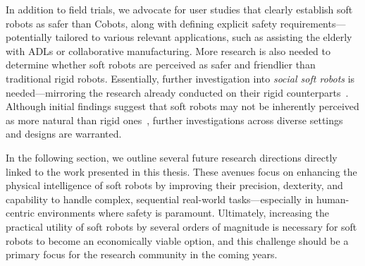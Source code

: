 In addition to field trials, we advocate for user studies that clearly establish soft robots as safer than \glspl{Cobot}, along with defining explicit safety requirements—potentially tailored to various relevant applications, such as assisting the elderly with \glspl{ADL} or collaborative manufacturing. More research is also needed to determine whether soft robots are perceived as safer and friendlier than traditional rigid robots.
Essentially, further investigation into \emph{social soft robots} is needed—mirroring the research already conducted on their rigid counterparts~\citep{breazeal2016social}.
Although initial findings suggest that soft robots may not be inherently perceived as more natural than rigid ones~\citep{jorgensen2022soft}, further investigations across diverse settings and designs are warranted.

In the following section, we outline several future research directions directly linked to the work presented in this thesis. These avenues focus on enhancing the physical intelligence of soft robots by improving their precision, dexterity, and capability to handle complex, sequential real-world tasks—especially in human-centric environments where safety is paramount. Ultimately, increasing the practical utility of soft robots by several orders of magnitude is necessary for soft robots to become an economically viable option, and this challenge should be a primary focus for the research community in the coming years.

